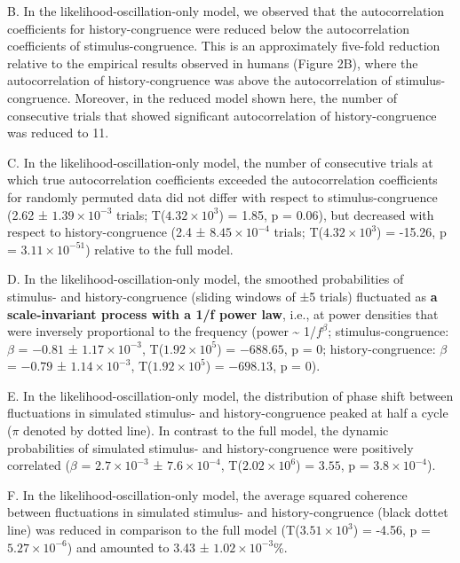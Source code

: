 \documentclass[
]{article}
\begin{document}
B. In the likelihood-oscillation-only model, we observed that the
autocorrelation coefficients for history-congruence were reduced below
the autocorrelation coefficients of stimulus-congruence. This is an
approximately five-fold reduction relative to the empirical results
observed in humans (Figure 2B), where the autocorrelation of
history-congruence was above the autocorrelation of stimulus-congruence.
Moreover, in the reduced model shown here, the number of consecutive
trials that showed significant autocorrelation of history-congruence was
reduced to 11.

C. In the likelihood-oscillation-only model, the number of consecutive
trials at which true autocorrelation coefficients exceeded the
autocorrelation coefficients for randomly permuted data did not differ
with respect to stimulus-congruence (2.62 ±
\ensuremath{1.39\times 10^{-3}} trials;
T(\ensuremath{4.32\times 10^{3}}) = 1.85, p = \(0.06\)), but decreased
with respect to history-congruence (2.4 ±
\ensuremath{8.45\times 10^{-4}} trials;
T(\ensuremath{4.32\times 10^{3}}) = -15.26, p =
\(\ensuremath{3.11\times 10^{-51}}\)) relative to the full model.

D. In the likelihood-oscillation-only model, the smoothed probabilities
of stimulus- and history-congruence (sliding windows of ±5 trials)
fluctuated as \textbf{a scale-invariant process with a 1/f power law},
i.e., at power densities that were inversely proportional to the
frequency (power \textasciitilde{} 1/\(f^\beta\); stimulus-congruence:
\(\beta\) = \(-0.81\) ± \(\ensuremath{1.17\times 10^{-3}}\),
T(\(\ensuremath{1.92\times 10^{5}}\)) = \(-688.65\), p = \(0\);
history-congruence: \(\beta\) = \(-0.79\) ±
\(\ensuremath{1.14\times 10^{-3}}\),
T(\(\ensuremath{1.92\times 10^{5}}\)) = \(-698.13\), p = \(0\)).

E. In the likelihood-oscillation-only model, the distribution of phase
shift between fluctuations in simulated stimulus- and history-congruence
peaked at half a cycle (\(\pi\) denoted by dotted line). In contrast to
the full model, the dynamic probabilities of simulated stimulus- and
history-congruence were positively correlated (\(\beta\) =
\(\ensuremath{2.7\times 10^{-3}}\) ± \(\ensuremath{7.6\times 10^{-4}}\),
T(\(\ensuremath{2.02\times 10^{6}}\)) = \(3.55\), p =
\(\ensuremath{3.8\times 10^{-4}}\)).

F. In the likelihood-oscillation-only model, the average squared
coherence between fluctuations in simulated stimulus- and
history-congruence (black dottet line) was reduced in comparison to the
full model (T(\ensuremath{3.51\times 10^{3}}) = -4.56, p =
\(\ensuremath{5.27\times 10^{-6}}\)) and amounted to 3.43 ±
\ensuremath{1.02\times 10^{-3}}\%.
\end{document}
